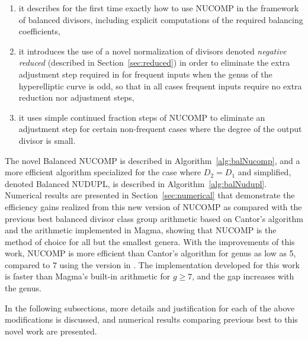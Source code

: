 \begin{enumerate}[label=4.\arabic*]
\item \label{im:1} it describes for the first time exactly how to use NUCOMP in
                   the framework of balanced divisors, including explicit
                   computations of the required balancing coefficients,

\item \label{im:2} it introduces the use of a novel normalization of divisors
                   denoted \emph{negative reduced} (described in
                   Section~\ref{sec:reduced}) in order to eliminate the extra
                   adjustment step required in \cite{jacobson_fast_2007} for
                   frequent inputs when the genus of the hyperelliptic curve is
                   odd, so that in all cases frequent inputs require no extra
                   reduction nor adjustment steps,

\item \label{im:3} it uses simple continued fraction steps of NUCOMP to
                   eliminate an adjustment step for certain non-frequent cases
                   where the degree of the output divisor is small.
\end{enumerate} 

The novel Balanced NUCOMP is described in Algorithm~\ref{alg:balNucomp}, and a
more efficient algorithm specialized for the case where $D_2 = D_1$ and
simplified, denoted Balanced NUDUPL, is described in
Algorithm~\ref{alg:balNudupl}. Numerical results are presented in
Section~\ref{sec:numerical} that demonstrate the efficiency gains realized from
this new version of NUCOMP as compared with the previous best balanced divisor
class group arithmetic based on Cantor's algorithm and the arithmetic
implemented in Magma, showing that NUCOMP is the method of choice for all but
the smallest genera.  With the improvements of this work, NUCOMP is more
efficient than Cantor's algorithm for genus as low as 5, compared to 7 using the
version in \cite{jacobson_fast_2007}.  The implementation developed for this
work is faster than Magma's built-in arithmetic for $g \geq 7$, and the gap
increases with the genus. 

In the following subsections, more details and justification for each of the 
above modifications is discussed, and numerical results comparing previous best to 
this novel work are presented.


